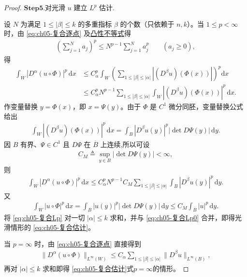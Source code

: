 \documentclass[../../main.tex]{subfiles}
\begin{document}
\begin{proof}
\noindent$\mathbf{Step}\bm{5}$.{\heiti 对光滑 $u$ 建立 $L^{p}$ 估计.}

设 $N$ 为满足 $1\leqslant|\beta|\leqslant k$ 的多重指标 $\beta$ 的个数（只依赖于 $n,k$）。当 $1\leqslant p<\infty$ 时，由 \eqref{eq:ch05-复合逐点} 及\hyperref[Basis of Analytics-proposition:凸性不等式]{凸性不等式}得
\begin{align*}
\left(\sum_{j=1}^{N}a_j\right)^{p}\leqslant N^{p-1}\sum_{j=1}^{N}a_j^{p}\qquad(a_j\geqslant0),
\end{align*}
得
\begin{align}
\int_{W}|D^{\alpha}(u\circ\Phi)|^{p}\,\mathrm{d}x
&\leqslant C_{\alpha}^{p}\int_{W}\left(\sum_{1\leqslant|\beta|\leqslant|\alpha|}|(D^{\beta}u)(\Phi(x))|\right)^{p}\mathrm{d}x
\nonumber\\
&\leqslant C_{\alpha}^{p}N^{p-1}\sum_{1\leqslant|\beta|\leqslant|\alpha|}\int_{W}|(D^{\beta}u)(\Phi(x))|^{p}\,\mathrm{d}x.
\label{eq:ch05-复合Lp1}
\end{align}
作变量替换 $y=\Phi(x)$，即 $x=\Psi(y)$。由于 $\Phi$ 是 $C^{1}$ 微分同胚，变量替换公式给出
\begin{align*}
\int_{W}|(D^{\beta}u)(\Phi(x))|^{p}\,\mathrm{d}x
=\int_{B}|D^{\beta}u(y)|^{p}|\det D\Psi(y)|\,\mathrm{d}y.
\end{align*}
因 $B$ 有界、$\Psi\in C^{1}$ 且 $D\Psi$ 在 $\overline{B}$ 上连续,所以可设
\begin{align*}
C_{M}\triangleq\sup_{y\in B}|\det D\Psi(y)|<\infty,
\end{align*}
则
\begin{align}
\int_{W}|D^{\alpha}(u\circ\Phi)|^{p}\,\mathrm{d}x
\leqslant C_{\alpha}^{p}N^{p-1}C_{M}\sum_{1\leqslant|\beta|\leqslant|\alpha|}\int_{B}|D^{\beta}u(y)|^{p}\,\mathrm{d}y.
\label{eq:ch05-复合Lp}
\end{align}
又
\begin{align}
\int_{W}|u\circ\Phi|^{p}\,\mathrm{d}x
=\int_{B}|u(y)|^{p}|\det D\Psi(y)|\,\mathrm{d}y
\leqslant C_{M}\int_{B}|u|^{p}\,\mathrm{d}y.
\label{eq:ch05-复合Lp0}
\end{align}
将 \eqref{eq:ch05-复合Lp} 对一切 $|\alpha|\leqslant k$ 求和，并与 \eqref{eq:ch05-复合Lp0} 合并，即得光滑情形的 \eqref{eq:ch05-复合估计}。

当 $p=\infty$ 时，由 \eqref{eq:ch05-复合逐点} 直接得到
\begin{align*}
\|D^{\alpha}(u\circ\Phi)\|_{L^{\infty}(W)}
\leqslant C_{\alpha}\sum_{1\leqslant|\beta|\leqslant|\alpha|}\|D^{\beta}u\|_{L^{\infty}(B)},
\end{align*}
再对 $|\alpha|\leqslant k$ 求和即得 \eqref{eq:ch05-复合估计}式$p=\infty$的情形。


\end{proof}
\end{document}
